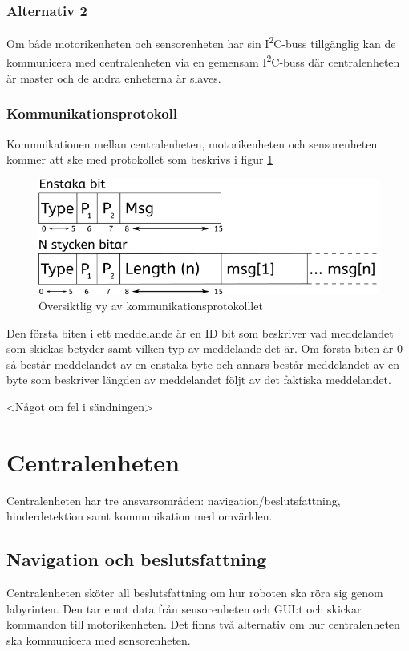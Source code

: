 \documentclass[a4paper,titlepage,12pt]{article}
\newcommand{\itc}{I\textsuperscript{2}C}
\begin{document}
	\subsubsection{Alternativ 2}
	Om både motorikenheten och sensorenheten har sin \itc{}-buss tillgänglig kan de 
	kommunicera med centralenheten via en gemensam \itc{}-buss där centralenheten är 
	master och de andra enheterna är slaves. 

	\subsubsection*{Kommunikationsprotokoll}
	\label{ssub:Kommunikationsprotokoll}
	Kommuikationen mellan centralenheten, motorikenheten och sensorenheten kommer att ske 
	med protokollet som beskrivs i figur \ref{fig:kommunikation1}

	\begin{figure}[h]
		\centering
		\includegraphics[width=0.5\linewidth]{images/communication_protocol1.png}
		\caption{Översiktlig vy av kommunikationsprotokolllet}
		\label{fig:kommunikation1}
	\end{figure}

	Den första biten i ett meddelande är en ID bit som beskriver vad meddelandet som
	skickas betyder samt vilken typ av meddelande det är. Om första biten är 0 så 
	består meddelandet av en enstaka byte och annars består meddelandet av en byte
	som beskriver längden av meddelandet följt av det faktiska meddelandet. 
	
	<Något om fel i sändningen>
	
	
	\section{Centralenheten}
	Centralenheten har tre ansvarsområden: navigation/beslutsfattning, hinderdetektion samt
	kommunikation med omvärlden.

	\subsection{Navigation och beslutsfattning}

	Centralenheten sköter all beslutsfattning om hur roboten ska röra sig
	genom labyrinten. Den tar emot data från sensorenheten och GUI:t och
	skickar kommandon till motorikenheten. Det finns två alternativ om hur
	centralenheten ska kommunicera med sensorenheten.
  
\end{document}
